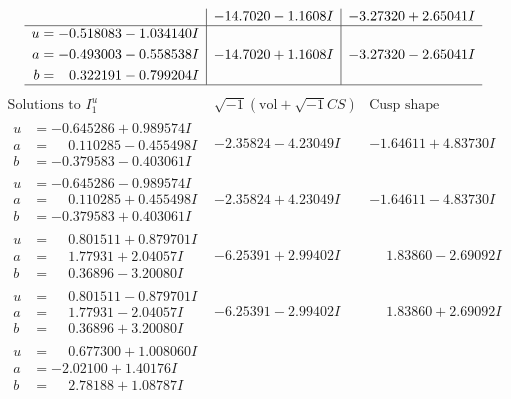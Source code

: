 \documentclass[1p]{elsarticle_modified}
\theoremstyle{definition}
\newcommand{\I}{\sqrt{-1}}
\begin{document}
$$\begin{array}{c|c|c}
 & -14.7020 - 1.1608 I & -3.27320 + 2.65041 I \\ \hline\begin{aligned}
u &= -0.518083 - 1.034140 I \\
a &= -0.493003 - 0.558538 I \\
b &= \phantom{-}0.322191 - 0.799204 I\end{aligned}
 & -14.7020 + 1.1608 I & -3.27320 - 2.65041 I\\
 \hline 
 \end{array}$$\newpage$$\begin{array}{c|c|c}  
\text{Solutions to }I^u_{1}& \I (\text{vol} + \sqrt{-1}CS) & \text{Cusp shape}\\
 \hline 
\begin{aligned}
u &= -0.645286 + 0.989574 I \\
a &= \phantom{-}0.110285 - 0.455498 I \\
b &= -0.379583 - 0.403061 I\end{aligned}
 & -2.35824 - 4.23049 I & -1.64611 + 4.83730 I \\ \hline\begin{aligned}
u &= -0.645286 - 0.989574 I \\
a &= \phantom{-}0.110285 + 0.455498 I \\
b &= -0.379583 + 0.403061 I\end{aligned}
 & -2.35824 + 4.23049 I & -1.64611 - 4.83730 I \\ \hline\begin{aligned}
u &= \phantom{-}0.801511 + 0.879701 I \\
a &= \phantom{-}1.77931 + 2.04057 I \\
b &= \phantom{-}0.36896 - 3.20080 I\end{aligned}
 & -6.25391 + 2.99402 I & \phantom{-}1.83860 - 2.69092 I \\ \hline\begin{aligned}
u &= \phantom{-}0.801511 - 0.879701 I \\
a &= \phantom{-}1.77931 - 2.04057 I \\
b &= \phantom{-}0.36896 + 3.20080 I\end{aligned}
 & -6.25391 - 2.99402 I & \phantom{-}1.83860 + 2.69092 I \\ \hline\begin{aligned}
u &= \phantom{-}0.677300 + 1.008060 I \\
a &= -2.02100 + 1.40176 I \\
b &= \phantom{-}2.78188 + 1.08787 I\end{aligned}

\end{array}$$
\end{document}
